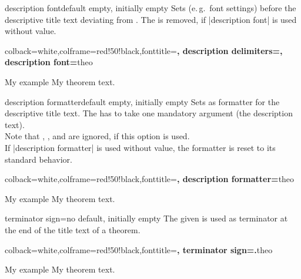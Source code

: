 \clearpage
\begin{docTcbKey}{description font}{}{default empty, initially empty}
  Sets  (e.\,g.\ font settings) before the descriptive title text deviating from .
  The  is removed, if |description font| is used without value.

\begin{dispExample}
%
  {colback=white,colframe=red!50!black,fonttitle=\bfseries,
   description delimiters={\glqq}{\grqq},
   description font=\mdseries\itshape}{theo}
\begin{sometheorem}{My example}{}
My theorem text.
\end{sometheorem}
\end{dispExample}
\end{docTcbKey}


\begin{docTcbKey}{description formatter}{}{default empty, initially empty}
  Sets  as formatter for the descriptive title text. The 
  has to take one mandatory argument (the description text).\\ 
  Note that , ,
  and  are ignored, if this option is used.\\
  If |description formatter| is used without value, the formatter is reset
  to its standard behavior.

\begin{dispExample}

%
  {colback=white,colframe=red!50!black,fonttitle=\bfseries,
   description formatter=\formbox}{theo}
\begin{sometheorem}{My example}{}
My theorem text.
\end{sometheorem}
\end{dispExample}
\end{docTcbKey}


\begin{docTcbKey}{terminator sign}{=}{no default, initially empty}
  The given  is used as terminator at the end of the title text of a theorem.

\begin{dispExample}
%
  {colback=white,colframe=red!50!black,fonttitle=\bfseries,
   terminator sign={.}}{theo}
\begin{sometheorem}{My example}{}
My theorem text.
\end{sometheorem}
\end{dispExample}
\end{docTcbKey}


